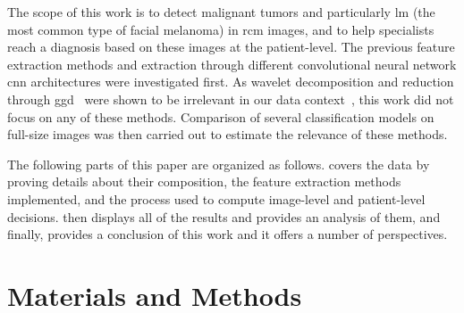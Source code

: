 \documentclass[journal,article,submit,moreauthors,pdftex, applsci]{Definitions/mdpi}
\begin{document}
The scope of this work is to detect malignant tumors and particularly \ac{lm} (the most common type of facial melanoma) in \ac{rcm} images, and to help specialists reach a diagnosis based on these images at the patient-level. The previous feature extraction methods and extraction through different convolutional neural network \ac{cnn} architectures were investigated first. As wavelet decomposition and reduction through \ac{ggd}~\cite{Halimi2017a} were shown to be irrelevant in our data context~\cite{Cendre2019a}, this work did not focus on any of these methods. Comparison of several classification models on full-size images was then carried out to estimate the relevance of these methods.\par
The following parts of this paper are organized as follows.  covers the data by proving details about their composition, the feature extraction methods implemented, and the process used to compute image-level and patient-level decisions.  then displays all of the results and provides an analysis of them, and finally,  provides a conclusion of this work and it offers a number of perspectives.\par

\section{Materials and Methods}
\label{sec:material}

\end{document}
